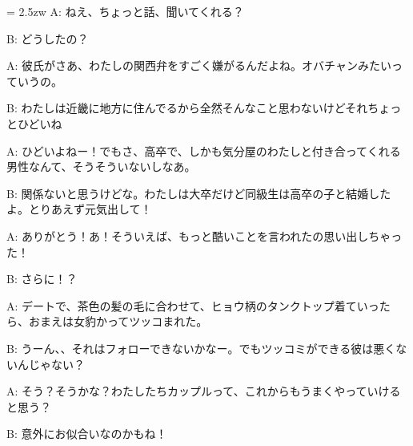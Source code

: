 \documentclass[11pt]{amsart}
\title{}
\author{}
\newenvironment{hangall}[1]{\hangindent = 2.5zw\everypar{\hangindent = 2.5zw}}{}
\begin{document}
\maketitle
\begin{hangall}{}%
A: ねえ、ちょっと話、聞いてくれる？

B: どうしたの？

A: 彼氏がさあ、わたしの関西弁をすごく嫌がるんだよね。オバチャンみたいっていうの。

B: わたしは近畿に地方に住んでるから全然そんなこと思わないけどそれちょっとひどいね

A: ひどいよねー！でもさ、高卒で、しかも気分屋のわたしと付き合ってくれる男性なんて、そうそういないしなあ。

B: 関係ないと思うけどな。わたしは大卒だけど同級生は高卒の子と結婚したよ。とりあえず元気出して！

A: ありがとう！あ！そういえば、もっと酷いことを言われたの思い出しちゃった！

B: さらに！？

A: デートで、茶色の髪の毛に合わせて、ヒョウ柄のタンクトップ着ていったら、おまえは女豹かってツッコまれた。

B: うーん、、それはフォローできないかなー。でもツッコミができる彼は悪くないんじゃない？

A: そう？そうかな？わたしたちカップルって、これからもうまくやっていけると思う？

B: 意外にお似合いなのかもね！
\end{hangall}
\end{document}
